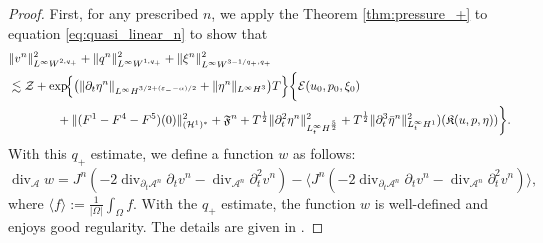\documentclass[letterpaper,reqno,10pt,twoside]{amsart}
\theoremstyle{definition}
\theoremstyle{remark}
\def\p{\partial}
\begin{document}
\begin{proof}
{			First, for any prescribed $n$, we apply the Theorem \ref{thm:pressure_+} to equation \eqref{eq:quasi_linear_n} to show that
			\[
			\begin{aligned}
				&\| v^{n}\|_{L^\infty W^{2,q_+}}^2 + \|q^{n}\|_{L^\infty W^{1,q_+}}^2 + \|\xi^{n}\|_{L^\infty W^{3-1/q_+,q_+}}^2 \\
				&\lesssim  \mathcal{Z}+\exp\!\Bigl\{
				\bigl(
				\|\partial_{t}\eta^{n}\|_{L^{\infty}H^{3/2+(\varepsilon_{-}-\alpha)/2}}
				+\|\eta^{n}\|_{L^{\infty}H^{3}}
				\bigr)T
				\Bigr\}\bigg\{ \mathcal{E}(u_{0},p_{0},\xi_{0}) \\
				&\quad\quad\quad\quad+\|(F^1-F^4-F^5)(0)\|^{2}_{(\mathcal{H}^1)^\ast}+\mathfrak{F}^{n}+T^{\frac{1}{2}}\|\p_{t}^{2}\eta^{n}\|^{2}_{L_{t}^{\infty}H^{\frac{5}{2}}}+T^{\frac{1}{2}}\|\p_{t}^{3}\bar{\eta}^{n}\|_{L_{t}^{\infty}H^{1}}^{2})(\mathfrak{K}(u,p,\eta))\bigg\}.
			\end{aligned}
			\]
			With this $q_{+}$ estimate, we define a function $w$ as follows:
			\[
			\operatorname{div}_{\mathcal{A}}w=J^{n}(-2\operatorname{div}_{\p_{t}\mathcal{A}^{n}}\p_{t}v^{n}-\operatorname{div}_{\mathcal{A}^{n}}\p_{t}^{2}v^{n})-\langle J^{n}(-2\operatorname{div}_{\p_{t}\mathcal{A}^{n}}\p_{t}v^{n}-\operatorname{div}_{\mathcal{A}^{n}}\p_{t}^{2}v^{n})\rangle,
			\]
			where $\langle f\rangle:=\frac{1}{|\Omega|}\int_{\Omega} f$.
			With the $q_{+}$ estimate, the function $w$ is well-defined and enjoys good regularity. The details are given in \cite[Proposition 10.1]{GT2020}.
			
}
\end{proof}
\end{document}
